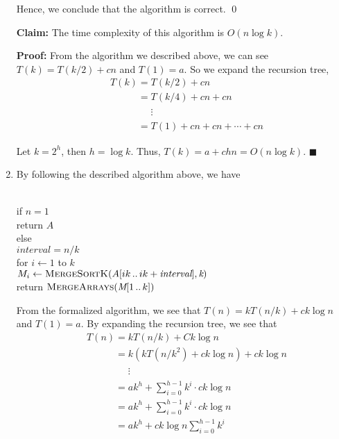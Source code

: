\documentclass[11pt]{article}
\begin{document}
\begin{solution}
\begin{enumerate}
			Hence, we conclude that the algorithm is correct.
			\qed
			
			\textbf{Claim:} The time complexity of this algorithm is $O(n\log k)$.
			
			\textbf{Proof:} 
				From the algorithm we described above, we can see $T(k) = T(k / 2) + cn$ and $T(1) = a$. So we expand the recursion tree, 
				\begin{align}
					& T(k) = T(k / 2) + cn\nonumber\\
					&\phantom{T(k)} = T(k / 4) + cn + cn\nonumber\\
					&\phantom{T(k) = } \vdots\nonumber\\
					&\phantom{T(k)} = T(1) + cn + cn + \cdots + cn\nonumber
				\end{align}
				
				Let $k = 2^h$, then $h = \log k$. Thus, $T(k) = a + chn = O(n\log k)$.
				$\blacksquare$
				
		\item By following the described algorithm above, we have
		\begin{center}
			\begin{algorithm}
				\+
				\\ if $\textit{n} = 1$\+
				\\  return $\textit{A}$\-
				\\ else\+
				\\$\textit{interval} = n / k$
				\\ for $i \gets 1$ to $k$\+
				\\ 	$M_i \gets \textsc{MergeSortK}(A[ik\,..\,ik + \textit{interval}], \textit{k})$\-
				\\ return $\textsc{MergeArrays}(\textit{M}[1\, ..\, k])$
			\end{algorithm}
		\end{center}
		
		From the formalized algorithm, we see that $T(n) = kT(n / k) + ck\log n$ and $T(1) = a$. By expanding the recursion tree, we see that 
		\begin{align}
			&T(n) = kT(n / k) + Ck\log n\nonumber\\
			&\phantom{T(n)} = k(kT(n / k^2) + ck\log n) + ck\log n\nonumber\\
			&\phantom{T(n) = } \vdots\nonumber\\
			&\phantom{T(n)} = ak^h + \sum_{i = 0}^{h - 1} k^i \cdot ck\log n \nonumber\\
			&\phantom{T(n)} = ak^h + \sum_{i = 0}^{h - 1} k^i \cdot ck\log n \nonumber\\
			&\phantom{T(n)} = ak^h +ck\log n\sum_{i = 0}^{h - 1} k^i \nonumber
		\end{align}
		

\end{enumerate}
\end{solution}
\end{document}
